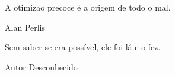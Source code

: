 \null %
\vfill
\epigraph{A otimiza\ca o precoce \'e a origem de todo o mal.}{Alan Perlis}
\epigraph{Sem saber se era poss\'ivel, ele foi l\'a e o fez.}{Autor Desconhecido}
